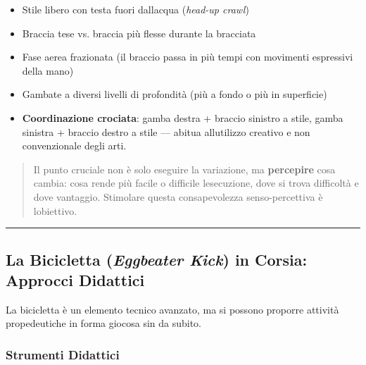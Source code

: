 \documentclass[a4paper,11pt]{article}
\providecommand{\tightlist}{%
  \setlength{\itemsep}{0pt}\setlength{\parskip}{0pt}}
\begin{document}
\begin{itemize}
      \tightlist
      \item
            Stile libero con testa fuori dall\textquotesingle acqua (\emph{head-up
                  crawl})
      \item
            Braccia tese vs. braccia più flesse durante la bracciata
      \item
            Fase aerea frazionata (il braccio passa in più tempi con movimenti
            espressivi della mano)
      \item
            Gambate a diversi livelli di profondità (più a fondo o più in
            superficie)
      \item
            \textbf{Coordinazione crociata}: gamba destra + braccio sinistro a
            stile, gamba sinistra + braccio destro a stile --- abitua
            all\textquotesingle utilizzo creativo e non convenzionale degli arti.
\end{itemize}

\begin{quote}
      Il punto cruciale non è solo eseguire la variazione, ma
      \textbf{percepire} cosa cambia: cosa rende più facile o difficile
      l\textquotesingle esecuzione, dove si trova difficoltà e dove vantaggio.
      Stimolare questa consapevolezza senso-percettiva è
      l\textquotesingle obiettivo.
\end{quote}

\begin{center}\rule{0.5\linewidth}{0.5pt}\end{center}

\subsection{\texorpdfstring{La Bicicletta (\emph{Eggbeater Kick}) in
            Corsia: Approcci
            Didattici}{La Bicicletta (Eggbeater Kick) in Corsia: Approcci Didattici}}\label{la-bicicletta-eggbeater-kick-in-corsia-approcci-didattici}

La bicicletta è un elemento tecnico avanzato, ma si possono proporre
attività propedeutiche in forma giocosa sin da subito.

\subsubsection{Strumenti Didattici}\label{strumenti-didattici}
\end{document}
